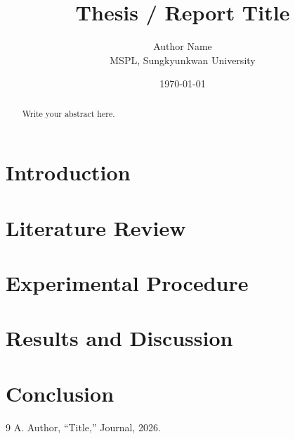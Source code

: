 \documentclass[11pt,a4paper]{report}
\title{Thesis / Report Title}
\author{Author Name\\MSPL, Sungkyunkwan University}
\date{\today}
\begin{document}
\maketitle
\tableofcontents

\begin{abstract}
Write your abstract here.
\end{abstract}

\chapter{Introduction}

\chapter{Literature Review}

\chapter{Experimental Procedure}

\chapter{Results and Discussion}

\chapter{Conclusion}

\begin{thebibliography}{9}
 A. Author, ``Title,'' Journal, 2026.
\end{thebibliography}
\end{document}
